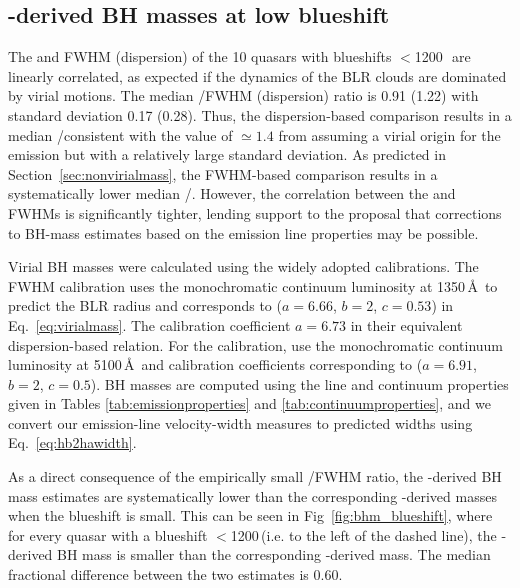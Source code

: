 \subsection{-derived BH masses at low  blueshift}
\label{sec:bhm_lowbs}

The \ha and  FWHM (dispersion) of the 10 quasars with  blueshifts $<$1200\,\kms\, are linearly correlated, as expected if the dynamics of the BLR clouds are dominated by virial motions. 
The median /\ha FWHM (dispersion) ratio is 0.91 (1.22) with standard deviation 0.17 (0.28). 
Thus, the dispersion-based comparison results in a median /\ha consistent with the value of $\simeq1.4$ from assuming a virial origin for the emission but with a relatively large standard deviation. 
As predicted in Section~\ref{sec:nonvirialmass}, the FWHM-based comparison results in a systematically lower median /\hans.
However, the correlation between the  and \ha FWHMs is significantly tighter, lending support to the proposal that corrections to BH-mass estimates based on the  emission line properties may be possible.

Virial BH masses were calculated using the widely adopted \citet{vestergaard06} calibrations. 
The \citet{vestergaard06}  FWHM calibration uses the monochromatic continuum luminosity at 1350\,\AA\, to predict the BLR radius and corresponds to ($a=6.66$, $b=2$, $c=0.53$) in Eq.~\ref{eq:virialmass}. 
The calibration coefficient $a=6.73$ in their equivalent dispersion-based relation. 
For the \hb calibration, \citet{vestergaard06} use the monochromatic continuum luminosity at 5100\,\AA\, and calibration coefficients corresponding to ($a=6.91$, $b=2$, $c=0.5$).
BH masses are computed using the line and continuum properties given in Tables \ref{tab:emissionproperties} and \ref{tab:continuumproperties}, and we convert our \ha emission-line velocity-width measures to predicted \hb widths using Eq.~\ref{eq:hb2hawidth}.

As a direct consequence of the empirically small /\ha FWHM ratio, the -derived BH mass estimates are systematically lower than the corresponding \hans-derived masses when the blueshift is small.
This can be seen in Fig~\ref{fig:bhm_blueshift}, where for every quasar with a  blueshift $<$1200\,\kms (i.e. to the left of the dashed line), the -derived BH mass is smaller than the corresponding \hans-derived mass.
The median fractional difference between the two estimates is 0.60.  

